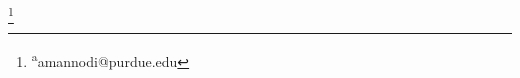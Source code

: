 \documentclass[twoside,twocolumn,9pt]{article}
\begin{document}
\footnote{
\textsuperscript{a}amannodi@purdue.edu\hspace{0.3cm}}

\vspace{1cm}





\end{document}
